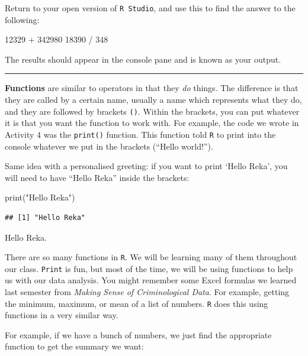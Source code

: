 \documentclass[
]{book}
\newenvironment{Shaded}{\begin{snugshade}}{\end{snugshade}}
\newcommand{\DecValTok}[1]{\textcolor[rgb]{0.00,0.00,0.81}{#1}}
\newcommand{\FunctionTok}[1]{\textcolor[rgb]{0.00,0.00,0.00}{#1}}
\newcommand{\NormalTok}[1]{#1}
\newcommand{\SpecialCharTok}[1]{\textcolor[rgb]{0.00,0.00,0.00}{#1}}
\newcommand{\StringTok}[1]{\textcolor[rgb]{0.31,0.60,0.02}{#1}}
\begin{document}
Return to your open version of \texttt{R\ Studio}, and use this to find the answer to the following:

\begin{Shaded}
\begin{Highlighting}[]
\DecValTok{12329} \SpecialCharTok{+} \DecValTok{342980}
\DecValTok{18390} \SpecialCharTok{/} \DecValTok{348}
\end{Highlighting}
\end{Shaded}

The results should appear in the console pane and is known as your output.

\begin{center}\rule{0.5\linewidth}{0.5pt}\end{center}

\textbf{Functions} are similar to operators in that they \emph{do} things. The difference is that they are called by a certain name, usually a name which represents what they do, and they are followed by brackets \texttt{()}. Within the brackets, you can put whatever it is that you want the function to work with. For example, the code we wrote in Activity 4 was the \texttt{print()} function. This function told \texttt{R} to print into the console whatever we put in the brackets (``Hello world!'').

Same idea with a personalised greeting: if you want to print `Hello Reka', you will need to have ``Hello Reka'' inside the brackets:

\begin{Shaded}
\begin{Highlighting}[]
\FunctionTok{print}\NormalTok{(}\StringTok{"Hello Reka"}\NormalTok{)}
\end{Highlighting}
\end{Shaded}

\begin{verbatim}
## [1] "Hello Reka"
\end{verbatim}

Hello Reka.

There are so many functions in \texttt{R}. We will be learning many of them throughout our class. \texttt{Print} is fun, but most of the time, we will be using functions to help us with our data analysis. You might remember some Excel formulas we learned last semester from \emph{Making Sense of Criminological Data}. For example, getting the minimum, maximum, or mean of a list of numbers. \texttt{R} does this using functions in a very similar way.

For example, if we have a bunch of numbers, we just find the appropriate function to get the summary we want:
\end{document}
